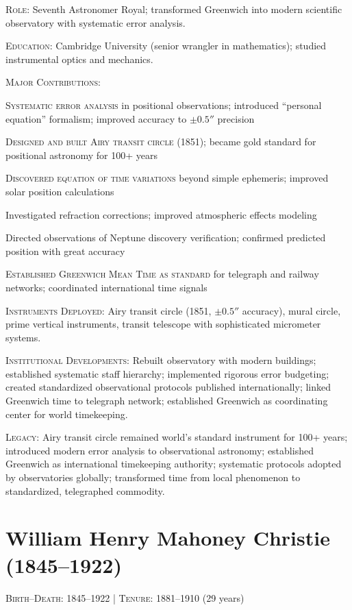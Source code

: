 \noindent\textsc{Role}: Seventh Astronomer Royal; transformed Greenwich into modern scientific observatory with systematic error analysis.

\noindent\textsc{Education}: Cambridge University (senior wrangler in mathematics); studied instrumental optics and mechanics.

\noindent\textsc{Major Contributions}:
\begin{enumerate*}[label=(\arabic*)]
\item \textsc{Systematic error analysis} in positional observations; introduced ``personal equation'' formalism; improved accuracy to $\pm 0.5''$ precision
\item \textsc{Designed and built Airy transit circle} (1851); became gold standard for positional astronomy for 100+ years
\item \textsc{Discovered equation of time variations} beyond simple ephemeris; improved solar position calculations
\item Investigated refraction corrections; improved atmospheric effects modeling
\item Directed observations of Neptune discovery verification; confirmed predicted position with great accuracy
\item \textsc{Established Greenwich Mean Time as standard} for telegraph and railway networks; coordinated international time signals
\end{enumerate*}

\noindent\textsc{Instruments Deployed}: Airy transit circle (1851, $\pm 0.5''$ accuracy), mural circle, prime vertical instruments, transit telescope with sophisticated micrometer systems.

\noindent\textsc{Institutional Developments}: Rebuilt observatory with modern buildings; established systematic staff hierarchy; implemented rigorous error budgeting; created standardized observational protocols published internationally; linked Greenwich time to telegraph network; established Greenwich as coordinating center for world timekeeping.

\noindent\textsc{Legacy}: Airy transit circle remained world's standard instrument for 100+ years; introduced modern error analysis to observational astronomy; established Greenwich as international timekeeping authority; systematic protocols adopted by observatories globally; transformed time from local phenomenon to standardized, telegraphed commodity.

\medskip

\section*{William Henry Mahoney Christie (1845--1922)}
\textsc{Birth--Death}: 1845--1922 | \textsc{Tenure}: 1881--1910 (29 years)

